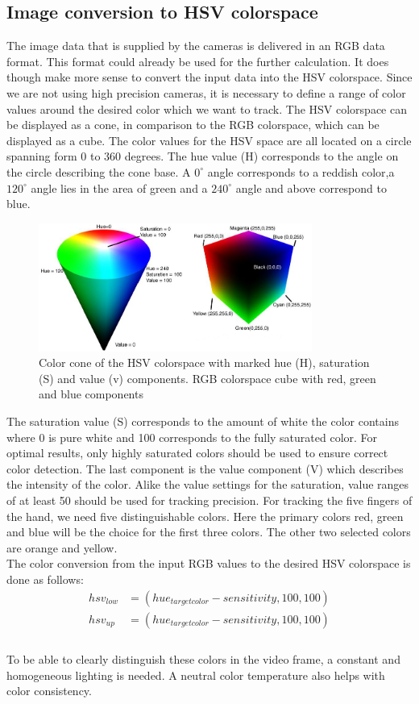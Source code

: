 \subsection{Image conversion to HSV colorspace}
The image data that is supplied by the cameras is delivered in an RGB data format. This  format could already be used for the further calculation. It does though make more sense to convert the input data into the HSV colorspace. Since we are not using high precision cameras, it is necessary to define a range of color values around the desired color which we want to track. The HSV colorspace can be displayed as a cone, in comparison to the RGB colorspace, which can be displayed as a cube. The color values for the HSV space are all located on a circle spanning form 0 to 360 degrees. The hue value (H) corresponds to the angle on the circle describing the cone base.   A $0^\circ$ angle corresponds to a reddish color,a $120^\circ$ angle lies in the area of green and a $240^\circ$ angle and above correspond to blue. 
\begin{figure}[H]
\centering
\includegraphics[width=0.8\textwidth]{images/hsv_and_rgb_colorspaces.JPG}
\caption{Color cone of the HSV colorspace with marked hue (H), saturation (S) and value (v) components. RGB colorspace cube with red, green and blue components \cite{Cardani.2001}}
\label{img:hsv_cone} 
\end{figure}The saturation value (S) corresponds to the amount of white the color contains  where 0 is pure white and 100 corresponds to the fully saturated color. For optimal results, only highly saturated colors should be used to ensure correct color detection. The last component is the value component (V) which describes the intensity of the color. Alike the value settings for the saturation, value ranges of at least 50 should be used for tracking precision.
For tracking the five fingers of the hand, we need five distinguishable colors.
Here the primary colors red, green and blue will be the choice for the first three colors. The other two selected colors are orange and yellow. \\The color conversion from the input RGB values to the desired HSV colorspace is done as follows:
\begin{equation}
\begin{split}
hsv_{low}&=(hue_{targetcolor}-sensitivity,100,100)\\
hsv_{up}&=(hue_{targetcolor}-sensitivity,100,100)\\
\end{split}
\end{equation}\\To be able to clearly distinguish these colors in the video frame, a constant and homogeneous lighting is needed. A neutral color temperature also helps with color consistency.
\newpage
